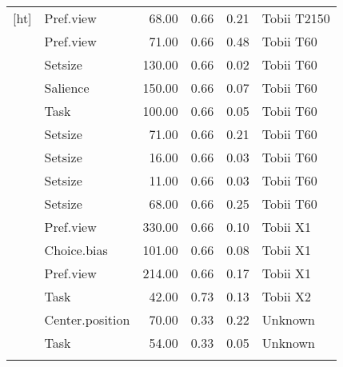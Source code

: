 \begin{longtable}{llrrrl}[ht]
  \cite{orquin2013} & Pref.view & 68.00 & 0.66 & 0.21 & Tobii T2150 \\ 
  \cite{ares2014} & Pref.view & 71.00 & 0.66 & 0.48 & Tobii T60 \\ 
  \cite{grebitus2015} & Setsize & 130.00 & 0.66 & 0.02 & Tobii T60 \\ 
  \cite{orquin2015a} & Salience & 150.00 & 0.66 & 0.07 & Tobii T60 \\ 
  \cite{orquin2015a} & Task & 100.00 & 0.66 & 0.05 & Tobii T60 \\ 
  \cite{orquin2020osfb} & Setsize & 71.00 & 0.66 & 0.21 & Tobii T60 \\ 
  \cite{orquin2020osfb} & Setsize & 16.00 & 0.66 & 0.03 & Tobii T60 \\ 
  \cite{orquin2020osfb} & Setsize & 11.00 & 0.66 & 0.03 & Tobii T60 \\ 
  \cite{orquin2020osfb} & Setsize & 68.00 & 0.66 & 0.25 & Tobii T60 \\ 
  \cite{behe2014} & Pref.view & 330.00 & 0.66 & 0.10 & Tobii X1 \\ 
  \cite{behe2015} & Choice.bias & 101.00 & 0.66 & 0.08 & Tobii X1 \\ 
  \cite{behe2017} & Pref.view & 214.00 & 0.66 & 0.17 & Tobii X1 \\ 
  \cite{hwang2017} & Task & 42.00 & 0.73 & 0.13 & Tobii X2 \\ 
  \cite{meissner2016a} & Center.position & 70.00 & 0.33 & 0.22 & Unknown \\ 
  \cite{pieters1999} & Task & 54.00 & 0.33 & 0.05 & Unknown \\ 
  \hline
\label{tab:overviewtable}
\end{longtable}
